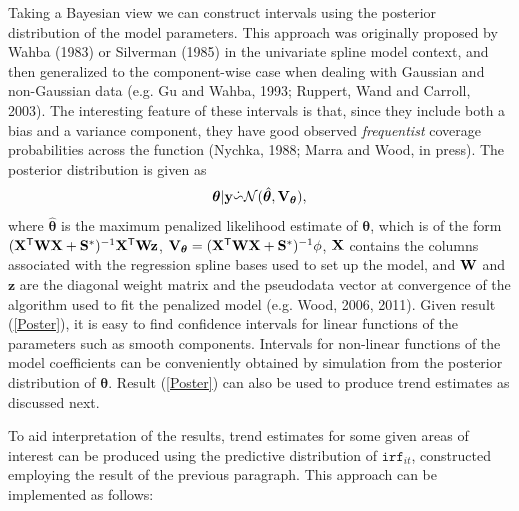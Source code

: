 \documentclass[12pt]{article}
\newcommand{\beq}{\begin{equation}}
\newcommand{\eeq}{\end{equation}}
\newcommand{\ts}{^{\sf T}}
\newcommand{\X}{{\bf X}}
\theoremstyle{definition}
\theoremstyle{plain}
\begin{document}
Taking a Bayesian view we can construct intervals using the posterior distribution of the model parameters. This approach was originally proposed by Wahba (1983) or Silverman (1985) in the univariate spline model context, and then generalized to the component-wise case when dealing with Gaussian and non-Gaussian data (e.g. Gu and Wahba, 1993; Ruppert, Wand and Carroll, 2003). The interesting feature of these intervals is that, since they include both a bias and a variance component, they have good observed \textit{frequentist} coverage probabilities across the function (Nychka, 1988; Marra and Wood, in press). The posterior distribution is given as
\beq
\bm\theta|{\bf y} \dot{\backsim} \mathcal{N}( \hat{\bm\theta}, {\bf V}_{\bm\theta} ),
\label{Poster}
\eeq
where $\hat{\bm\theta}$ is the maximum penalized likelihood estimate of $\bm\theta$, which is of the form $(\X\ts{\bf W}\X+{\bf S}^*)^{-1}\X\ts{\bf W}{\bf z}$, ${\bf V}_{\bm\theta} = (\X\ts{\bf W}\X+{\bf S}^*)^{-1}\phi$, $\X$ contains the columns associated with the regression spline bases used to set up the model, and ${\bf W}$ and $\mathbf{z}$ are the diagonal weight matrix and the pseudodata vector at convergence of the algorithm used to fit the penalized model (e.g. Wood, 2006, 2011). Given result (\ref{Poster}), it is easy to find confidence intervals for linear functions of the parameters such as smooth components. Intervals for non-linear functions of the model coefficients can be conveniently obtained by simulation from the posterior distribution of $\bm\theta$. Result (\ref{Poster}) can also be used to produce trend estimates as discussed next.

To aid interpretation of the results, trend estimates for some given areas of interest can be produced using the predictive distribution of $\texttt{irf}_{it}$, constructed employing the result of the previous paragraph. This approach can be implemented as follows:
\end{document}

